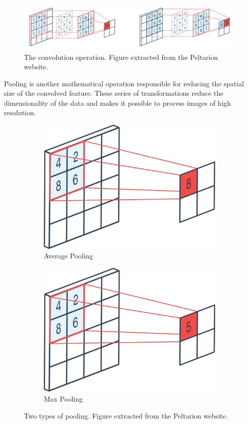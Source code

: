 \begin{figure}[h!tp]
    \centering
    \includegraphics[width=.89\textwidth]{imgs/chap3_convolution.png}
    \caption[The convolution operation.]{The convolution operation. Figure extracted from the Peltarion website\footnotemark.}
    \label{fig:data_augmentation}
\end{figure}


Pooling is another mathematical operation responsible for reducing the spatial size of the convolved feature. These series of transformations reduce the dimensionality of the data and makes it possible to process images of high resolution. 

\begin{figure}[h!tp]
\centering
\begin{subfigure}{.45\textwidth}
  \centering
  \includegraphics[width=.5\linewidth]{imgs/chap3_max_pooling.png}
  \caption{Average Pooling}
  \label{fig:sub1}
\end{subfigure}
\begin{subfigure}{.45\textwidth}
  \centering
  \includegraphics[width=.5\linewidth]{imgs/chap3_avg_pooling.png}
  \caption{Max Pooling}
  \label{fig:sub2}
\end{subfigure}
\caption[Two types of pooling.]{Two types of pooling. Figure extracted from the Peltarion website\footnotemark.}
\label{fig:pooling}
\end{figure}

